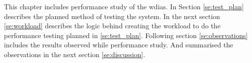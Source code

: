 
This chapter includes performance study of the \acrshort{wdias}. In Section \ref{se:test_plan} describes the planned method of testing the system.
In the next section \ref{se:workload} describes the logic behind creating the workload to do the performance testing planned in \ref{se:test_plan}.
Following section \ref{se:observations} includes the results observed while performance study. And summarised the observations in the next section \ref{se:discussion}.
